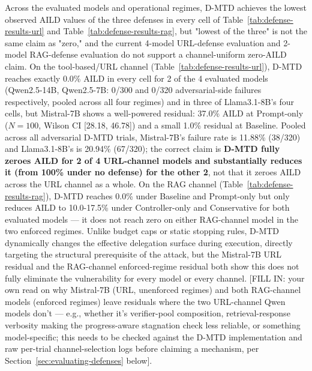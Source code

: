 \documentclass[conference]{IEEEtran}
\begin{document}
Across the evaluated models and operational regimes,
D-MTD achieves the lowest observed AILD values of the three defenses in every cell of Table~\ref{tab:defense-results-url} and Table~\ref{tab:defense-results-rag}, but "lowest of the three" is not the same claim as "zero," and the current 4-model URL-defense evaluation and 2-model RAG-defense evaluation do not support a channel-uniform zero-AILD claim. On the tool-based/URL channel (Table~\ref{tab:defense-results-url}), D-MTD reaches exactly 0.0\% AILD in every cell for 2 of the 4 evaluated models (Qwen2.5-14B, Qwen2.5-7B: 0/300 and 0/320 adversarial-side failures respectively, pooled across all four regimes) and in three of Llama3.1-8B's four cells, but Mistral-7B shows a well-powered residual: 37.0\% AILD at Prompt-only ($N=100$, Wilson CI [28.18, 46.78]) and a small 1.0\% residual at Baseline. Pooled across all adversarial D-MTD trials, Mistral-7B's failure rate is 11.88\% (38/320) and Llama3.1-8B's is 20.94\% (67/320); the correct claim is \textbf{D-MTD fully zeroes AILD for 2 of 4 URL-channel models and substantially reduces it (from 100\% under no defense) for the other 2}, not that it zeroes AILD across the URL channel as a whole. On the RAG channel (Table~\ref{tab:defense-results-rag}), D-MTD reaches 0.0\% under Baseline and Prompt-only but only reduces AILD to 10.0-17.5\% under Controller-only and Conservative for both evaluated models — it does not reach zero on either RAG-channel model in the two enforced regimes. Unlike budget caps
or static stopping rules, D-MTD dynamically changes the
effective delegation surface during execution, directly targeting the structural prerequisite of the attack, but the Mistral-7B URL residual and the RAG-channel enforced-regime residual both show this does not fully eliminate the vulnerability for every model or every channel. [FILL IN: your own read on why Mistral-7B (URL, unenforced regimes) and both RAG-channel models (enforced regimes) leave residuals where the two URL-channel Qwen models don't — e.g., whether it's verifier-pool composition, retrieval-response verbosity making the progress-aware stagnation check less reliable, or something model-specific; this needs to be checked against the D-MTD implementation and raw per-trial channel-selection logs before claiming a mechanism, per Section~\ref{sec:evaluating-defenses} below].
\end{document}
